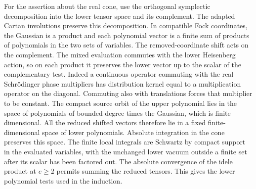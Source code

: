 For the assertion about the real cone, use the orthogonal symplectic
decomposition into the lower tensor space and its complement. The
adapted Cartan involutions preserve this decomposition. In compatible
Fock coordinates, the Gaussian is a product and each polynomial
vector is a finite sum of products of polynomials in the two sets of
variables. The removed-coordinate shift acts on the complement.
The mixed evaluation commutes with the lower Heisenberg action, so
on each product it preserves the lower vector up to the scalar of
the complementary test. Indeed a continuous operator commuting with
the real Schr\"odinger phase multipliers has distribution kernel equal
to a multiplication operator on the diagonal. Commuting also with
translations forces that multiplier to be constant.
The compact source orbit of the upper polynomial lies in the space
of polynomials of bounded degree times the Gaussian, which is finite
dimensional. All the reduced shifted vectors therefore lie in a
fixed finite-dimensional space of lower polynomials. Absolute
integration in the cone preserves this space. The finite local
integrals are Schwartz by compact support in the evaluated variables,
with the unchanged lower vacuum outside a finite set after its scalar
has been factored out. The absolute convergence of the idele product
at \(e\ge2\) permits summing the reduced tensors. This gives the lower
polynomial tests used in the induction.

